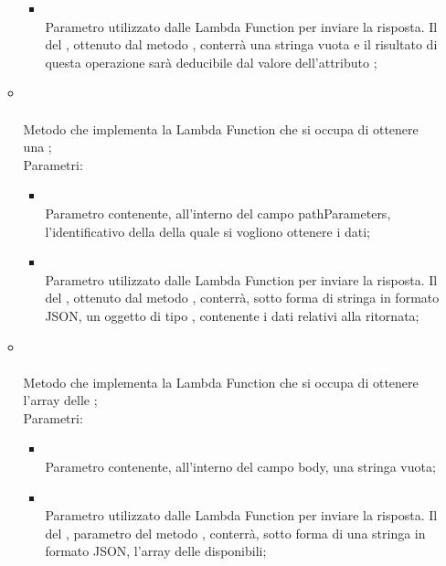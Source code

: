 \begin{itemize}
\begin{itemize}
\begin{itemize}
			\item {} \\
			Parametro utilizzato dalle Lambda Function per inviare la risposta. Il  del , ottenuto dal metodo , conterrà una stringa vuota e il risultato di questa operazione sarà deducibile dal valore dell'attributo ;
		\end{itemize}
		\item[]  \\\\		Metodo che implementa la Lambda Function che si occupa di ottenere una ;\\
		Parametri:
		\begin{itemize}
			\item {} \\
			Parametro contenente, all'interno del campo pathParameters, l'identificativo della  della quale si vogliono ottenere i dati;
			\item {} \\
			Parametro utilizzato dalle Lambda Function per inviare la risposta. Il  del , ottenuto dal metodo , conterrà, sotto forma di stringa in formato JSON, un oggetto di tipo , contenente i dati relativi alla  ritornata;
		\end{itemize}
		\item[]  \\\\		Metodo che implementa la Lambda Function che si occupa di ottenere l'array delle ;\\
		Parametri:
		\begin{itemize}
			\item {} \\
			Parametro contenente, all'interno del campo body, una stringa vuota;
			\item {} \\
			Parametro utilizzato dalle Lambda Function per inviare la risposta. Il  del , parametro del metodo , conterrà, sotto forma di una stringa in formato JSON,  l'array delle  disponibili;

\end{itemize}
\end{itemize}
\end{itemize}
